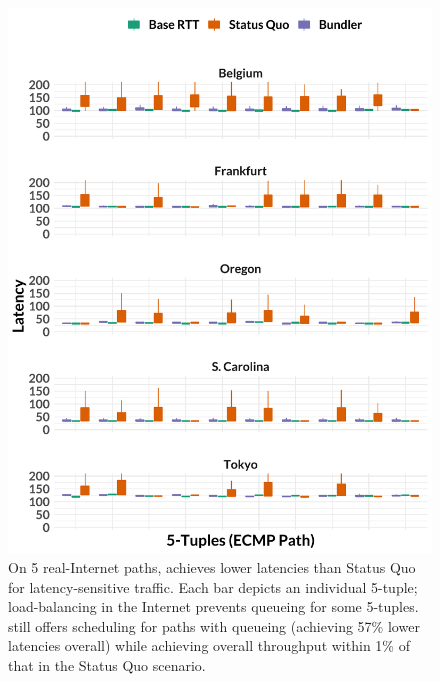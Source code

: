 \begin{figure}
    \centering
\begin{knitrout}
\color{fgcolor}
\includegraphics[width=\maxwidth]{figure/eval:realworld-1} 

\end{knitrout}
\newcommand{\realworldMedianLatencyImprovement}{57\%\xspace}
\newcommand{\realworldAvgBwRatio}{1\%\xspace}
\caption{On 5 real-Internet paths, \name achieves lower latencies than Status Quo for latency-sensitive traffic. Each bar depicts an individual 5-tuple; load-balancing in the Internet prevents queueing for some 5-tuples. \name still offers scheduling for paths with queueing (achieving \realworldMedianLatencyImprovement lower latencies overall) while achieving overall throughput within \realworldAvgBwRatio of that in the Status Quo scenario.}
    \label{fig:eval:realworld}
\end{figure}

\newcommand{\realworldMedianLatencyImprovement}{57\%\xspace}
\newcommand{\realworldAvgBwRatio}{1\%\xspace}
